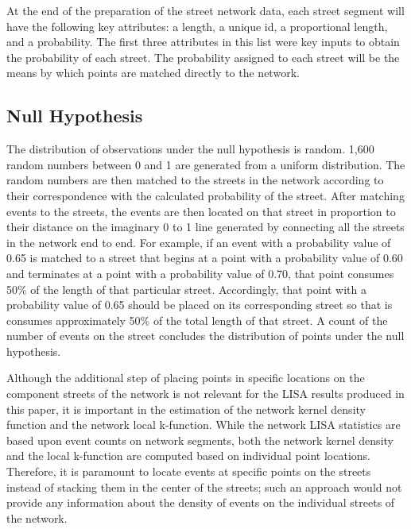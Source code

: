 \documentclass[12pt, letterpaper]{article}
\begin{document}
At the end of the preparation of the street network data, each street segment will have the following key attributes: a length, a unique id, a proportional length, and a probability. The first three attributes in this list were key inputs to obtain the probability of each street. The probability assigned to each street will be the means by which points are matched directly to the network.

\subsection {Null Hypothesis}
The distribution of observations under the null hypothesis is random. 1,600 random numbers between 0 and 1 are generated from a uniform distribution. The random numbers are then matched to the streets in the network according to their correspondence with the calculated probability of the street. After matching events to the streets, the events are then located on that street in proportion to their distance on the imaginary 0 to 1 line generated by connecting all the streets in the network end to end. For example, if an event with a probability value of 0.65 is matched to a street that begins at a point with a probability value of 0.60 and terminates at a point with a probability value of 0.70, that point consumes 50\% of the length of that particular street. Accordingly, that point with a probability value of 0.65 should be placed on its corresponding street so that is consumes approximately 50\% of the total length of that street. A count of the number of events on the street concludes the distribution of points under the null hypothesis.

Although the additional step of placing points in specific locations on the component streets of the network is not relevant for the LISA results produced in this paper, it is important in the estimation of the network kernel density function and the network local k-function. While the network LISA statistics are based upon event counts on network segments, both the network kernel density and the local k-function are computed based on individual point locations. Therefore, it is paramount to locate events at specific points on the streets instead of stacking them in the center of the streets; such an approach would not provide any information about the density of events on the individual streets of the network. %
\end{document}
